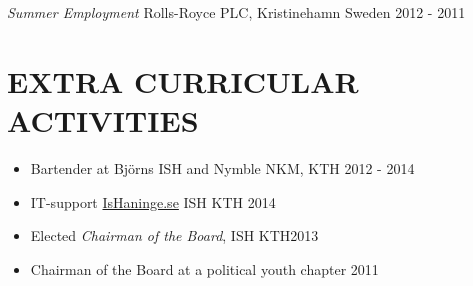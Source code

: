 \documentclass[margin]{res}
\begin{document}
\begin{resume}
                
     {\sl Summer Employment } Rolls-Royce PLC, Kristinehamn Sweden \hfill 2012 - 2011 
                 


\section{EXTRA CURRICULAR ACTIVITIES}
\begin{itemize}  
            \item Bartender at Björns ISH and Nymble NKM, KTH \hfill 2012 - 2014 
            \item IT-support \href{ishaninge.se}{IsHaninge.se}  ISH KTH \hfill 2014
            \item Elected {\it Chairman of the Board},  ISH KTH\hfill 2013 
            \item Chairman of the Board at a  political youth chapter \hfill 2011
\end{itemize}

\end{resume}
\end{document}
